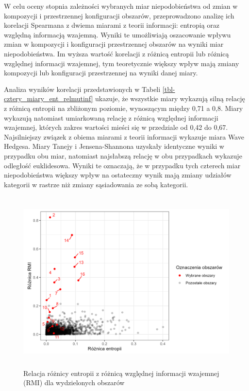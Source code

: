 \documentclass{amuthesis}
\begin{document}
W celu oceny stopnia zależności wybranych miar niepodobieństwa od zmian
w kompozycji i przestrzennej konfiguracji obszarów, przeprowadzono
analizę ich korelacji Spearmana z dwiema miarami z teorii informacji:
entropią oraz względną informacją wzajemną. Wyniki te umożliwiają
oszacowanie wpływu zmian w kompozycji i konfiguracji przestrzennej
obszarów na wyniki miar niepodobieństwa. Im wyższa wartość korelacji z
różnicą entropii lub różnicą względnej informacji wzajemnej, tym
teoretycznie większy wpływ mają zmiany kompozycji lub konfiguracji
przestrzennej na wyniki danej miary.

Analiza wyników korelacji przedstawionych w Tabeli
\ref{tbl-cztery_miary_ent_relmutinf} ukazuje, że wszystkie miary
wykazują silną relację z różnicą entropii na zbliżonym poziomie,
wynoszącym między 0,71 a 0,8. Miary wykazują natomiast umiarkowaną
relację z różnicą względnej informacji wzajemnej, których zakres
wartości mieści się w przedziale od 0,42 do 0,67. Najsilniejszy związek
z obiema miarami z teorii informacji wykazuje miara Wave Hedgesa. Miary
Tanejy i Jensena-Shannona uzyskały identyczne wyniki w przypadku obu
miar, natomiast najsłabszą relację w obu przypadkach wykazuje odległość
euklidesowa. Wyniki te oznaczają, że w przypadku tych czterech miar
niepodobieństwa większy wpływ na ostateczny wynik mają zmiany udziałów
kategorii w rastrze niż zmiany sąsiadowania ze sobą kategorii.

\begin{figure}[t]

{\centering \includegraphics[width=5.20833in,height=3.64583in]{figures/clc_ent_vs_relmutinf.png}

}

\caption{\label{fig-clc_ent_vs_relmutinf}Relacja różnicy entropii z
różnicą względnej informacji wzajemnej (RMI) dla wydzielonych obszarów}

\end{figure}
\end{document}
